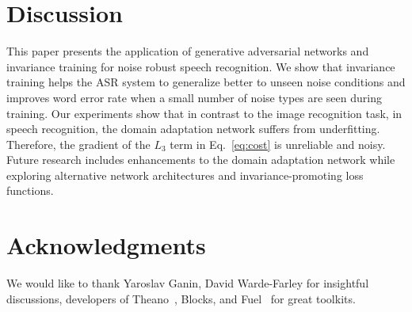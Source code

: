 \documentclass{article}
\begin{document}
\section{Discussion}
\label{sec:discussion}
    This paper presents the application of generative adversarial networks and invariance training for noise robust speech recognition. We show that invariance training helps the ASR system to generalize better to unseen noise conditions and improves word error rate when a small number of noise types are seen during training. Our experiments show that in contrast to the image recognition task, in speech recognition,  the domain adaptation network suffers from underfitting. Therefore, the gradient of the $L_3$ term in Eq.~\ref{eq:cost} is unreliable and noisy. Future research includes enhancements to the domain adaptation network while exploring alternative network architectures and invariance-promoting loss functions.
        


\section*{Acknowledgments}

We would like to thank Yaroslav Ganin, David Warde-Farley for insightful discussions,
developers of Theano~\cite{2016arXiv160502688short}, Blocks, and Fuel~\cite{MerrienboerBDSW15} 
for great toolkits.

%


\end{document}
